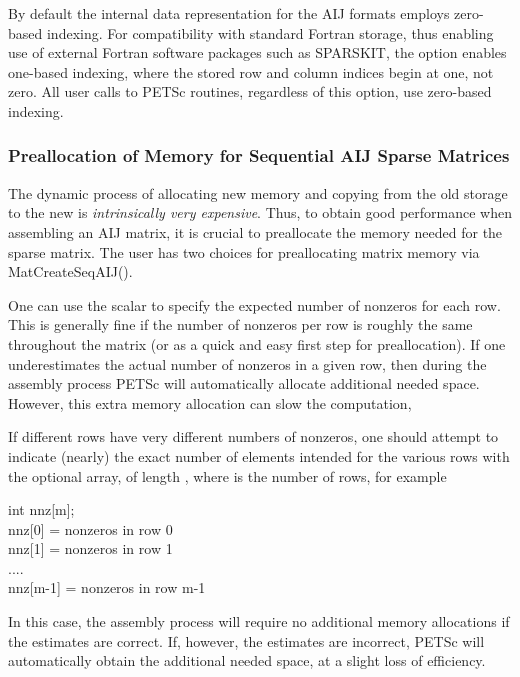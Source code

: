 By default the internal data representation for the AIJ formats employs
zero-based indexing.  For compatibility with standard Fortran storage,
thus enabling use of external Fortran software packages such as
SPARSKIT,  the option 
 enables one-based indexing, where the stored
row and column indices begin at one, not zero.  All user calls to
PETSc routines, regardless of this option, use zero-based indexing.

\subsubsection{Preallocation of Memory for Sequential AIJ Sparse Matrices}

The dynamic process of allocating new memory and copying from the old
storage to the new is {\em intrinsically very expensive}.  Thus, to
obtain good performance when assembling an AIJ matrix, it is crucial
to preallocate the memory needed for the sparse matrix.  The user has
two choices for preallocating matrix memory via MatCreateSeqAIJ().

One can use the scalar  to specify the expected
number of nonzeros for each row.  This is generally fine if the number
of nonzeros per row is roughly the same throughout the matrix (or as a
quick and easy first step for preallocation).  If one underestimates
the actual number of nonzeros in a given row, then during the assembly
process PETSc will automatically allocate additional needed space.
However, this extra memory allocation can slow the computation,

If different rows have very different numbers of nonzeros, one
should attempt to indicate (nearly) the exact number of elements
intended for the various rows with the optional array,  of
length , where  is the number of rows, for example
\begin{tabbing}
   int nnz[m];\\
   nnz[0] = \trl{<}nonzeros in row 0\trl{>}\\
   nnz[1] = \trl{<}nonzeros in row 1\trl{>}\\
   ....\\
   nnz[m-1] = \trl{<}nonzeros in row m-1\trl{>}
\end{tabbing}
In this case, the assembly process will require no additional memory
allocations if the  estimates are correct. If, however,
the  estimates are incorrect, PETSc will automatically
obtain the additional needed space, at a slight loss of efficiency.

